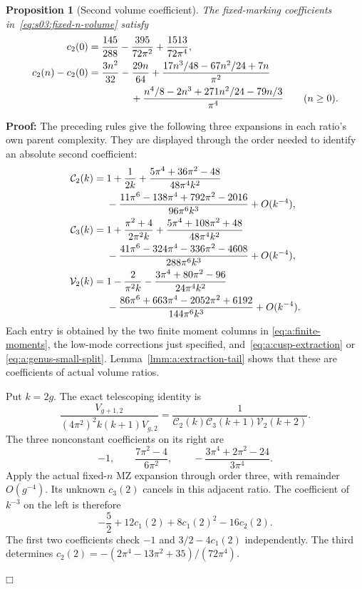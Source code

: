 \documentclass[a4paper,10pt]{article}
\numberwithin{equation}{section}
\theoremstyle{paperplain}
\newtheorem{prp}[thm]{Proposition}
\theoremstyle{paperremark}
\theoremstyle{paperplain}
\newenvironment{prf}{\noindent \textbf{Proof: }}{\hfill $\mdlgwhtsquare$\par\addvspace{0.5\baselineskip}}
\begin{document}
\begin{prp}[Second volume coefficient]\label{prp:a:c-two}
The fixed-marking coefficients in~\eqref{eq:s03:fixed-n-volume} satisfy
\begin{align}
 c_2(0)&=\frac{145}{288}-\frac{395}{72\pi^2}
                                  +\frac{1513}{72\pi^4},
 \label{eq:a:c-two-zero}\\
 c_2(n)-c_2(0)&=\frac{3n^2}{32}-\frac{29n}{64}
 +\frac{17n^3/48-67n^2/24+7n}{\pi^2}\notag\\
 &\hspace{15mm}
 +\frac{n^4/8-2n^3+271n^2/24-79n/3}{\pi^4}
 \qquad(n\geq0).
 \label{eq:a:c-two-n}
\end{align}
\end{prp}
\begin{prf}
The preceding rules give the following three expansions in each ratio's
own parent complexity. They are displayed through the order needed to
identify an absolute second coefficient:
\begin{align}
 \mathcal C_2(k)={}&1+\frac1{2k}
 +\frac{5\pi^4+36\pi^2-48}{48\pi^4k^2}\notag\\
 &-\frac{11\pi^6-138\pi^4+792\pi^2-2016}{96\pi^6k^3}
 +O(k^{-4}),\notag\\
 \mathcal C_3(k)={}&1+\frac{\pi^2+4}{2\pi^2k}
 +\frac{5\pi^4+108\pi^2+48}{48\pi^4k^2}\notag\\
 &-\frac{41\pi^6-324\pi^4-336\pi^2-4608}{288\pi^6k^3}
 +O(k^{-4}),\notag\\
 \mathcal V_2(k)={}&1-\frac2{\pi^2k}
 -\frac{3\pi^4+80\pi^2-96}{24\pi^4k^2}\notag\\
 &-\frac{86\pi^6+663\pi^4-2052\pi^2+6192}{144\pi^6k^3}
 +O(k^{-4}).
 \label{eq:a:three-ratios}
\end{align}
Each entry is obtained by the two finite moment columns in
\eqref{eq:a:finite-moments}, the low-mode corrections just specified,
and~\eqref{eq:a:cusp-extraction} or
\eqref{eq:a:genus-small-split}. Lemma~\ref{lmm:a:extraction-tail}
shows that these are coefficients of actual volume ratios.

Put $k=2g$. The exact telescoping identity is
\begin{equation}\label{eq:a:adjacent-genus-match}
 \frac{V_{g+1,2}}{(4\pi^2)^2 k(k+1)V_{g,2}}
 =\frac1{\mathcal C_2(k)\mathcal C_3(k+1)\mathcal V_2(k+2)}.
\end{equation}
The three nonconstant coefficients on its right are
\[
 -1,\qquad \frac{7\pi^2-4}{6\pi^2},\qquad
                    -\frac{3\pi^4+2\pi^2-24}{3\pi^4}.
\]
Apply the actual fixed-$n$ MZ expansion through order three, with
remainder $O(g^{-4})$. Its unknown $c_3(2)$ cancels in this adjacent
ratio. The coefficient of $k^{-3}$ on the left is therefore
\[
 -\frac52+12c_1(2)+8c_1(2)^2-16c_2(2).
\]
The first two coefficients check $-1$ and $3/2-4c_1(2)$ independently.
The third determines
$c_2(2)=-(2\pi^4-13\pi^2+35)/(72\pi^4)$.


\end{prf}
\end{document}
